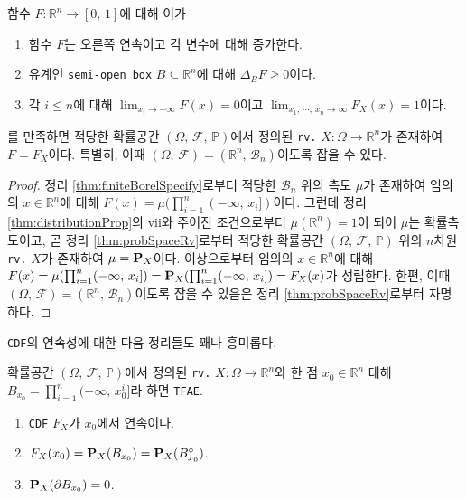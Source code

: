 \begin{theorem}
    함수 $F:\mathbb{R}^n\to[0,\,1]$에 대해 이가
    \begin{enumerate}
        \item 함수 $F$는 오른쪽 연속이고 각 변수에 대해 증가한다.
        \item 유계인 \texttt{semi-open box} $B\subseteq\mathbb{R}^n$에 대해 $\Delta_BF\geq0$이다.
        \item 각 $i\leq n$에 대해 $\lim_{x_i\to-\infty}F(x)=0$이고 $\lim_{x_1,\,\cdots,\,x_n\to\infty}F_X(x)=1$이다.
    \end{enumerate}
    를 만족하면 적당한 확률공간 $(\Omega,\,\mathcal{F},\,\mathbb{P})$에서 정의된 \texttt{rv.} $X:\Omega\to\mathbb{R}^n$가 존재하여 $F=F_X$이다. 특별히, 이때 $(\Omega,\,\mathcal{F})=(\mathbb{R}^n,\,\mathcal{B}_n)$이도록 잡을 수 있다.
\end{theorem}

\begin{proof}
    정리 \ref{thm:finiteBorelSpecify}로부터 적당한 $\mathcal{B}_n$ 위의 측도 $\mu$가 존재하여 임의의 $x\in\mathbb{R}^n$에 대해 $F(x)=\mu(\prod_{i=1}^n(-\infty,\,x_i])$이다. 그런데 정리 \ref{thm:distributionProp}의 vii와 주어진 조건으로부터 $\mu(\mathbb{R}^n)=1$이 되어 $\mu$는 확률측도이고, 곧 정리 \ref{thm:probSpaceRv}로부터 적당한 확률공간 $(\Omega,\,\mathcal{F},\,\mathbb{P})$ 위의 $n$차원 \texttt{rv.} $X$가 존재하여 $\mu=\mathbf{P}_X$이다. 이상으로부터 임의의 $x\in\mathbb{R}^n$에 대해 $F(x)=\mu(\prod_{i=1}^n(-\infty,\,x_i])=\mathbf{P}_X(\prod_{i=1}^n(-\infty,\,x_i])=F_X(x)$가 성립한다. 한편, 이때 $(\Omega,\,\mathcal{F})=(\mathbb{R}^n,\,\mathcal{B}_n)$이도록 잡을 수 있음은 정리 \ref{thm:probSpaceRv}로부터 자명하다.
\end{proof}

\texttt{CDF}의 연속성에 대한 다음 정리들도 꽤나 흥미롭다.

\begin{theorem}\label{thm:CDFContinuous}
    확률공간 $(\Omega,\,\mathcal{F},\,\mathbb{P})$에서 정의된 \texttt{rv.} $X:\Omega\to\mathbb{R}^n$와 한 점 $x_0\in\mathbb{R}^n$ 대해 $B_{x_0}=\prod_{i=1}^n(-\infty,\,x_0^i]$라 하면 \texttt{TFAE}.
    \begin{enumerate}
        \item \texttt{CDF} $F_X$가 $x_0$에서 연속이다.
        \item $F_X(x_0)=\mathbf{P}_X(B_{x_0})=\mathbf{P}_X(B_{x_0}^\circ)$.
        \item $\mathbf{P}_X(\partial B_{x_0})=0$.
    \end{enumerate}
\end{theorem}

